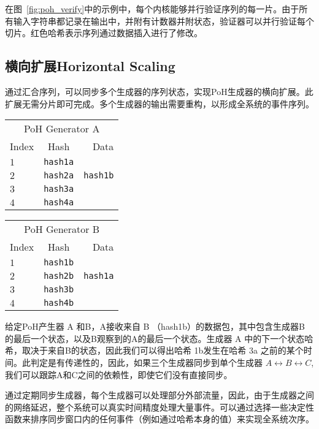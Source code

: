 \documentclass[12pt, uft8]{ctexart}
\begin{document}
在图~\ref{fig:poh_verify}中的示例中，每个内核能够并行验证序列的每一片。由于所有输入字符串都记录在输出中，并附有计数器并附状态，验证器可以并行验证每个切片。红色哈希表示序列通过数据插入进行了修改。

\subsection{横向扩展Horizontal Scaling}\label{poh:scale}
通过汇合序列，可以同步多个生成器的序列状态，实现PoH生成器的横向扩展。此扩展无需分片即可完成。多个生成器的输出需要重构，以形成全系统的事件序列。

\begin{center}
  \begin{tabular}{|l c r|}

  \hline
    \multicolumn{3}{|c|}{PoH Generator A} \\
    Index & Hash & Data \\ \hline
    $1$ & \texttt{hash1a} & \\
    $2$ & \texttt{hash2a} & \texttt{hash1b} \\
    $3$ & \texttt{hash3a} & \\
    $4$ & \texttt{hash4a} & \\
    \hline
    \end{tabular}
  \begin{tabular}{| l  c  r |}
  \hline
    \multicolumn{3}{|c|}{PoH Generator B} \\
    Index & Hash & Data \\ \hline
    $1$ & \texttt{hash1b} & \\
    $2$ & \texttt{hash2b} & \texttt{hash1a} \\
    $3$ & \texttt{hash3b} & \\
    $4$ & \texttt{hash4b} & \\
    \hline
    \end{tabular}
\end{center}

给定PoH产生器 A 和B，A接收来自 B （hash1b）的数据包，其中包含生成器B 的最后一个状态，以及B观察到的A的最后一个状态。生成器 A 中的下一个状态哈希，取决于来自B的状态，因此我们可以得出哈希 1b发生在哈希 3a 之前的某个时间。此判定是有传递性的，因此，如果三个生成器同步到单个生成器  \(A \leftrightarrow B \leftrightarrow C\), 我们可以跟踪A和C之间的依赖性，即使它们没有直接同步。

通过定期同步生成器，每个生成器可以处理部分外部流量，因此，由于生成器之间的网络延迟，整个系统可以真实时间精度处理大量事件。可以通过选择一些决定性函数来排序同步窗口内的任何事件（例如通过哈希本身的值）来实现全系统次序。
\end{document}
